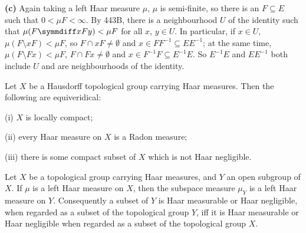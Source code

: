 {\medskip

{\bf (c)} Again taking a left Haar measure $\mu$, $\mu$ is semi-finite, so
there is an $F\subseteq E$ such that $0<\mu F<\infty$.   By 443B, there is
a neighbourhood $U$ of the identity such that $\mu(F\symmdiff xFy)<\mu F$
for all $x$, $y\in U$.   In particular, if $x\in U$,
$\mu(F\setminus xF)<\mu F$, so $F\cap xF\ne\emptyset$ and
$x\in FF^{-1}\subseteq EE^{-1}$;  at the same time,
$\mu(F\setminus Fx)<\mu F$, $F\cap Fx\ne\emptyset$ and
$x\in F^{-1}F\subseteq E^{-1}E$.   So $E^{-1}E$ and $EE^{-1}$ both include
$U$ and are neighbourhoods of the identity.
}%


 Let $X$ be a Hausdorff topological group
carrying Haar measures.   Then the following are equiveridical:

(i) $X$ is locally compact;

(ii) every Haar measure on $X$ is a Radon measure;

(iii) there is some compact subset of $X$ which is not Haar negligible.


 Let $X$ be a topological group carrying Haar
measures, and $Y$ an open subgroup of $X$.   If $\mu$ is a left Haar
measure on $X$, then the subspace measure $\mu_Y$ is a left Haar measure
on $Y$.   Consequently a subset of $Y$ is Haar measurable or Haar
negligible, when regarded as a subset of the topological group $Y$, iff
it is Haar measurable or Haar negligible when regarded as a subset of
the topological group $X$.

